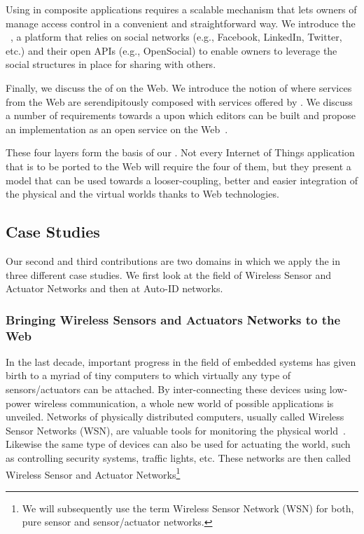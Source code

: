 Using \sts{} in composite applications requires a scalable  mechanism that lets owners of \sts{} manage access control in a convenient and straightforward way. We introduce the \sacLong{}~\cite{Guinard2010-sharing}, a platform that relies on social networks (e.g., Facebook, LinkedIn, Twitter, etc.) and their open APIs (e.g., OpenSocial) to enable owners to leverage the social structures in place for sharing \sts{} with others.

Finally, we discuss the  of \sts{} on the Web. We introduce the notion of \newterm{\pMashups{}} where services from the Web are serendipitously composed with services offered by \sts{}. We discuss a number of requirements towards a \pMashupsFw{} upon which \pMashup{} editors can be built and propose an implementation as an open service on the Web~\cite{Guinard2010-mashup-home}.

These four layers form the basis of our \WoTA{}. Not every Internet of Things application that is to be ported to the Web will require the four of them, but they present a model that can be used towards a looser-coupling, better and easier integration of the physical and the virtual worlds thanks to Web technologies.

\subsection{Case Studies}
Our second and third contributions are two domains in which we apply the \WoTA{} in three different case studies. We first look at the field of Wireless Sensor and Actuator Networks and then at Auto-ID networks.

\subsubsection{Bringing Wireless Sensors and Actuators Networks to the Web}
In the last decade, important progress in the field of embedded systems has given birth to a myriad of tiny computers to which virtually any type of sensors/actuators can be attached. By inter-connecting these devices using low-power wireless communication, a whole new world of possible applications is unveiled. Networks of physically distributed computers, usually called Wireless Sensor Networks (WSN), are valuable tools for monitoring the physical world~\cite{Vasseur2010}. Likewise the same type of devices can also be used for actuating the world, such as controlling security systems, traffic lights, etc. These networks are then called Wireless Sensor and Actuator Networks\footnote{We will subsequently use the term Wireless Sensor Network (WSN) for both, pure sensor and sensor/actuator networks.}


